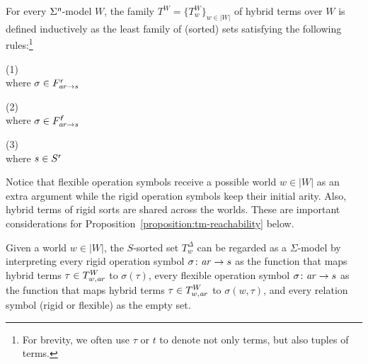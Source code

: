 \documentclass[a4paper,UKenglish,cleveref,autoref]{lipics-v2019}
\begin{document}
For every \(\Sigma^{\text{\normalfont\sffamily\itshape n}}\)-model \(W\),
the family \(T^{W} = \{ T^{W}_{w} \}_{w \in |W|}\) of hybrid terms over \(W\) is defined inductively as the least family of (sorted) sets satisfying the following rules:\footnote{For brevity, we often use \(\tau\) or \(t\) to denote not only terms, but also tuples of terms.}

\medskip
\noindent
\parbox{12.25em}{%
  \textsf{(1)}~\\[1ex]
   where \(\sigma \in F^{\text{\normalfont\sffamily\itshape r}}_{\mathit{a\mkern -1mu r} \to s}\)
}
\hfill
\parbox{12.25em}{%
  \textsf{(2)}~\\[1ex]
   where \(\sigma \in F^{\text{\normalfont\sffamily\itshape f}}_{\mathit{a\mkern -1mu r} \to s}\)
}
\hfill
\parbox{12.25em}{%
  \textsf{(3)}~\\[1ex]
   where \(s \in S^{\text{\normalfont\sffamily\itshape r}}\)
}
\medskip

\noindent Notice that flexible operation symbols receive a possible world \(w \in |W|\) as an extra argument while the rigid operation symbols keep their initial arity.
Also, hybrid terms of rigid sorts are shared across the worlds.
These are important considerations for Proposition~\ref{proposition:tm-reachability} below.

Given a world \(w \in |W|\), the \(S\)-sorted set \(T^{\Delta}_{w}\) can be regarded as a \(\Sigma\)-model by interpreting
every rigid operation symbol \(\sigma \colon \mathit{a\mkern -1mu r} \to s\) as the function that maps hybrid terms \(\tau \in T^{W}_{w, \mathit{a\mkern -1mu r}}\) to \(\sigma(\tau)\),
every flexible operation symbol \(\sigma \colon \mathit{a\mkern -1mu r} \to s\) as the function that maps hybrid terms \(\tau \in T^{W}_{w, \mathit{a\mkern -1mu r}}\) to \(\sigma(w, \tau)\),
and every relation symbol (rigid or flexible) as the empty set.
\end{document}
